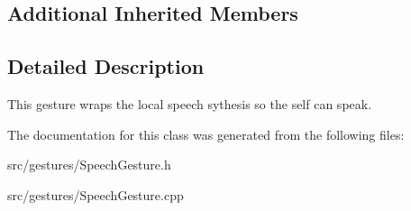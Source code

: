 \subsection*{Additional Inherited Members}


\subsection{Detailed Description}
This gesture wraps the local speech sythesis so the self can speak. 

The documentation for this class was generated from the following files\+:\begin{DoxyCompactItemize}
\item 
src/gestures/Speech\+Gesture.\+h\item 
src/gestures/Speech\+Gesture.\+cpp\end{DoxyCompactItemize}
